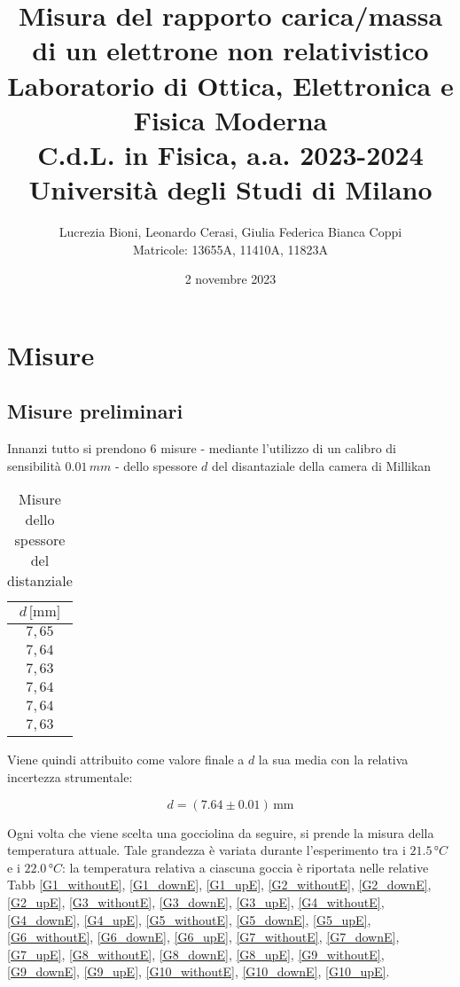 \documentclass[]{article}
\title{%
    \Huge Misura del rapporto carica/massa di un elettrone non relativistico \\
    \Large Laboratorio di Ottica, Elettronica e Fisica Moderna \\ C.d.L. in Fisica, a.a. 2023-2024 \\ Università degli Studi di Milano}
\author{\LARGE Lucrezia Bioni, Leonardo Cerasi, Giulia Federica Bianca Coppi \\ Matricole: 13655A, 11410A, 11823A}
\date{2 novembre 2023}
\let\oldsection\section%
\renewcommand{\section}{%
	\renewcommand{\theequation}{\thesection.\arabic{equation}}%
	\oldsection}%
\let\oldsubsection\subsection%
\renewcommand{\subsection}{%
	\renewcommand{\theequation}{\thesubsection.\arabic{equation}}%
	\oldsubsection}%
\begin{document}
    \maketitle

    \section{Misure}

    \subsection{Misure preliminari}

    Innanzi tutto si prendono 6 misure - mediante l'utilizzo di un calibro di sensibilità $ 0.01\, mm $ - dello spessore $ d $ del disantaziale della camera di Millikan

    \begin{table}[H]
        \centering
    
        \begin{tabular}{||c||}
            \hline
            $d\, \text{[mm]} $ \\
            \hline\hline
    
            $ 7,65 $ \\\hline
            $ 7,64 $ \\\hline
            $ 7,63 $ \\\hline
            $ 7,64 $ \\\hline
            $ 7,64 $ \\\hline
            $ 7,63 $ \\\hline

        
        \end{tabular}
        \caption{Misure dello spessore del distanziale}
        \label{distanziale}
    \end{table}

    Viene quindi attribuito come valore finale a $ d $ la sua media con la relativa incertezza strumentale:

    \begin{equation}
        \label{misura_Rb}
        d = (7.64 \pm 0.01) \, \text{mm}
    \end{equation} 

    Ogni volta che viene scelta una gocciolina da seguire, si prende la misura della temperatura attuale. Tale grandezza è variata durante l'esperimento tra i $ 21.5\, °C $ e i $ 22.0\, °C $: la temperatura relativa a ciascuna goccia è riportata nelle relative Tabb \ref{G1_withoutE}, \ref{G1_downE}, \ref{G1_upE}, \ref{G2_withoutE}, \ref{G2_downE}, \ref{G2_upE}, \ref{G3_withoutE}, \ref{G3_downE}, \ref{G3_upE}, \ref{G4_withoutE}, \ref{G4_downE}, \ref{G4_upE}, \ref{G5_withoutE}, \ref{G5_downE}, \ref{G5_upE}, \ref{G6_withoutE}, \ref{G6_downE}, \ref{G6_upE}, \ref{G7_withoutE}, \ref{G7_downE}, \ref{G7_upE}, \ref{G8_withoutE}, \ref{G8_downE}, \ref{G8_upE}, \ref{G9_withoutE}, \ref{G9_downE}, \ref{G9_upE}, \ref{G10_withoutE}, \ref{G10_downE}, \ref{G10_upE}. \\
\end{document}
